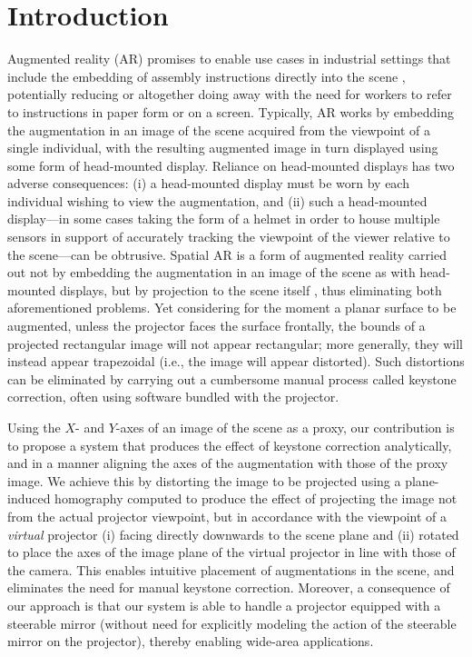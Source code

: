 \documentclass[review]{elsarticle}
\begin{document}
\linenumbers

\section{Introduction}\label{sec:intro}

Augmented reality (AR) \cite{van2010survey,zhou2008trends} promises to enable use cases in industrial settings that include the embedding of assembly instructions directly into the scene \cite{schlund2018moglichkeiten,masood2019augmented,gattullo2019towards}, potentially reducing or altogether doing away with the need for workers to refer to instructions in paper form or on a screen. Typically, AR works by embedding the augmentation in an image of the scene acquired from the viewpoint of a single individual, with the resulting augmented image in turn displayed using some form of head-mounted display. Reliance on head-mounted displays has two adverse consequences: (i) a head-mounted display must be worn by each individual wishing to view the augmentation, and (ii) such a head-mounted display---in some cases taking the form of a helmet in order to house multiple sensors in support of accurately tracking the viewpoint of the viewer relative to the scene---can be obtrusive. Spatial AR is a form of augmented reality carried out not by embedding the augmentation in an image of the scene as with head-mounted displays, but by projection to the scene itself \cite{bimber2019spatial}, thus eliminating both aforementioned problems. Yet considering for the moment a planar surface to be augmented, unless the projector faces the surface frontally, the bounds of a projected rectangular image will not appear rectangular; more generally, they will instead appear trapezoidal (i.e., the image will appear distorted). Such distortions can be eliminated by carrying out a cumbersome manual process called keystone correction, often using software bundled with the projector.

Using the $X$- and $Y$-axes of an image of the scene as a proxy, our contribution is to propose a system that produces the effect of keystone correction analytically, and in a manner aligning the axes of the augmentation with those of the proxy image. We achieve this by distorting the image to be projected using a plane-induced homography computed to produce the effect of projecting the image not from the actual projector viewpoint, but in accordance with the viewpoint of a \textit{virtual} projector (i) facing directly downwards to the scene plane and (ii) rotated to place the axes of the image plane of the virtual projector in line with those of the camera. This enables intuitive placement of augmentations in the scene, and eliminates the need for manual keystone correction. Moreover, a consequence of our approach is that our system is able to handle a projector equipped with a steerable mirror (without need for explicitly modeling the action of the steerable mirror on the projector), thereby enabling wide-area applications.
\end{document}
